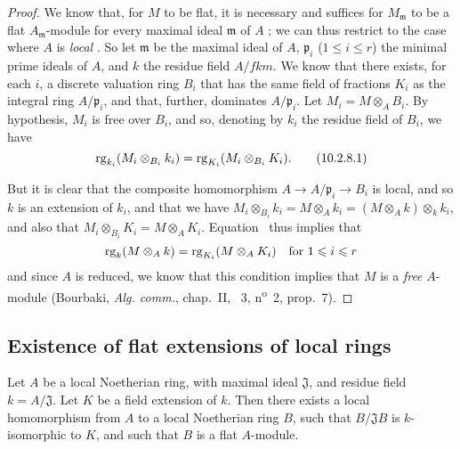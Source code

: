 \begin{proof}
\label{proof-0.10.2.8}
We know that, for $M$ to be flat, it is necessary and suffices for $M_\mathfrak{m}$ to be a flat $A_\mathfrak{m}$-module for every maximal ideal $\mathfrak{m}$ of $A$ ;
we can thus restrict to the case where $A$ is \emph{local} .
So let $\mathfrak{m}$ be the maximal ideal of $A$, $\mathfrak{p}_i$ ($1\leq i\leq r$) the minimal prime ideals of $A$, and $k$ the residue field $A/fk{m}$.
We know  that there exists, for each $i$, a discrete valuation ring $B_i$ that has the same field of fractions $K_i$ as the integral ring $A/\mathfrak{p}_i$, and that, further, dominates $A/\mathfrak{p}_i$.
Let $M_i=M\otimes_A B_i$.
By hypothesis, $M_i$ is free over $B_i$, and so, denoting by $k_i$ the residue field of $B_i$, we have
\[
\label{0.10.2.8.1}
  \operatorname{rg}_{k_i}(M_i\otimes_{B_i}k_i)=\operatorname{rg}_{K_i}(M_i\otimes_{B_i}K_i).
  \tag{10.2.8.1}
\]

But it is clear that the composite homomorphism $A\to A/\mathfrak{p}_i\to B_i$ is local, and so $k$ is an extension of $k_i$, and that we have $M_i\otimes_{B_i}k_i = M\otimes_A k_i = (M\otimes_A k)\otimes_k k_i$, and also that $M_i\otimes_{B_i}K_i = M\otimes_A K_i$.
Equation~ thus implies that
\[
  \operatorname{rg}_k(M\otimes_A k)=\operatorname{rg}_{K_i}(M\otimes_A K_i)\quad\mbox{for $1\leqslant i\leqslant r$}
\]
and since $A$ is reduced, we know that this condition implies that $M$ is a \emph{free} $A$-module (Bourbaki, \emph{Alg. comm.}, chap.~II, \textsection~3, n\textsuperscript{o}~2, prop.~7).
\end{proof}

\subsection{Existence of flat extensions of local rings}
\label{subsection:0.10.3}

\begin{proposition}[10.3.1]
\label{0.10.3.1}
Let $A$ be a local Noetherian ring, with maximal ideal $\mathfrak{J}$, and residue field $k=A/\mathfrak{J}$.
Let $K$ be a field extension of $k$.
Then there exists a local homomorphism from $A$ to a local Noetherian ring $B$, such that $B/\mathfrak{J}B$ is $k$-isomorphic to $K$, and such that $B$ is a flat $A$-module.
\end{proposition}

